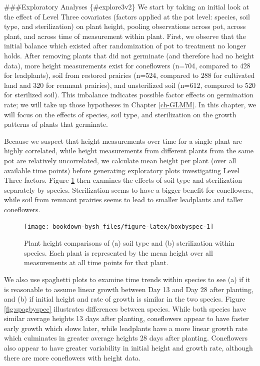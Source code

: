 \documentclass[
]{krantz}
\begin{document}
\#\#\#Exploratory Analyses \{\#explore3v2\}
We start by taking an initial look at the effect of Level Three covariates (factors applied at the pot level: species, soil type, and sterilization) on plant height, pooling observations across pot, across plant, and across time of measurement within plant. First, we observe that the initial balance which existed after randomization of pot to treatment no longer holds. After removing plants that did not germinate (and therefore had no height data), more height measurements exist for coneflowers (n=704, compared to 428 for leadplants), soil from restored prairies (n=524, compared to 288 for cultivated land and 320 for remnant prairies), and unsterilized soil (n=612, compared to 520 for sterilized soil). This imbalance indicates possible factor effects on germination rate; we will take up those hypotheses in Chapter \ref{ch-GLMM}. In this chapter, we will focus on the effects of species, soil type, and sterilization on the growth patterns of plants that germinate.

Because we suspect that height measurements over time for a single plant are highly correlated, while height measurements from different plants from the same pot are relatively uncorrelated, we calculate mean height per plant (over all available time points) before generating exploratory plots investigating Level Three factors. Figure \ref{fig:boxbyspec} then examines the effects of soil type and sterilization separately by species. Sterilization seems to have a bigger benefit for coneflowers, while soil from remnant prairies seems to lead to smaller leadplants and taller coneflowers.

\begin{figure}

{\centering \texttt{[image: bookdown-bysh\_files/figure-latex/boxbyspec-1]} 

}

\caption{Plant height comparisons of (a) soil type and (b) sterilization within species.  Each plant is represented by the mean height over all measurements at all time points for that plant.}\label{fig:boxbyspec}
\end{figure}

We also use spaghetti plots to examine time trends within species to see (a) if it is reasonable to assume linear growth between Day 13 and Day 28 after planting, and (b) if initial height and rate of growth is similar in the two species. Figure \ref{fig:spagbyspec} illustrates differences between species. While both species have similar average heights 13 days after planting, coneflowers appear to have faster early growth which slows later, while leadplants have a more linear growth rate which culminates in greater average heights 28 days after planting. Coneflowers also appear to have greater variability in initial height and growth rate, although there are more coneflowers with height data.
\end{document}
